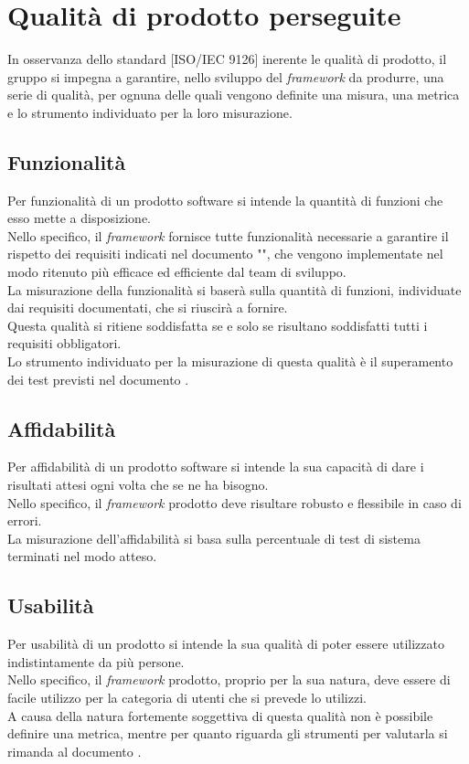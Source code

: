
\section{Qualità di prodotto perseguite}
	In osservanza dello standard [ISO/IEC 9126] inerente le qualità di prodotto, il gruppo \groupname{} si impegna a garantire, nello sviluppo del \textit{framework} da produrre, una serie di qualità, per ognuna delle quali vengono definite una misura, una metrica e lo strumento individuato per la loro misurazione.
	\subsection{Funzionalità}
		Per funzionalità di un prodotto software si intende la quantità di funzioni che esso mette a disposizione.\\
		Nello specifico, il \textit{framework} fornisce tutte funzionalità necessarie a garantire il rispetto dei requisiti indicati nel documento "", che vengono implementate nel modo ritenuto più efficace ed efficiente dal team di sviluppo.\\
		La misurazione della funzionalità si baserà sulla quantità di funzioni, individuate dai requisiti documentati, che si riuscirà a fornire.\\
		Questa qualità si ritiene soddisfatta se e solo se risultano soddisfatti tutti i requisiti obbligatori.\\
		Lo strumento individuato per la misurazione di questa qualità è il superamento dei test previsti nel documento .
	\subsection{Affidabilità}
		Per affidabilità di un prodotto software si intende la sua capacità di dare i risultati attesi ogni volta che se ne ha bisogno.\\
		Nello specifico, il \textit{framework} prodotto deve risultare robusto e flessibile in caso di errori.\\
		La misurazione dell'affidabilità si basa sulla percentuale di test di sistema terminati nel modo atteso.
	\subsection{Usabilità}
		Per usabilità di un prodotto si intende la sua qualità di poter essere utilizzato indistintamente da più persone.\\
		Nello specifico, il \textit{framework} prodotto, proprio per la sua natura, deve essere di facile utilizzo per la categoria di utenti che si prevede lo utilizzi.\\
		A causa della natura fortemente soggettiva di questa qualità non è possibile definire una metrica, mentre per quanto riguarda gli strumenti per valutarla si rimanda al documento .
